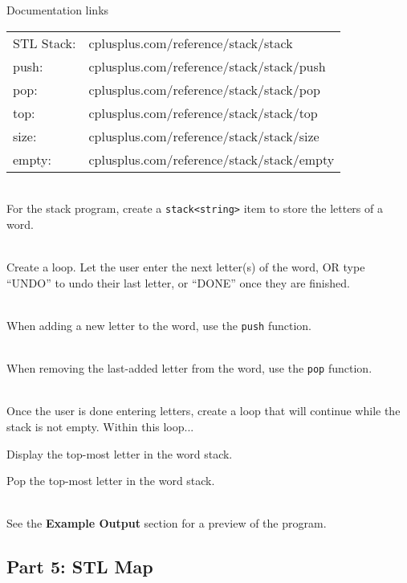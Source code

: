         
        \begin{hint}{Documentation links} ~\\
            \begin{tabular}{ l l }
                STL Stack:      & cplusplus.com/reference/stack/stack \\
                push:           & cplusplus.com/reference/stack/stack/push \\
                pop:            & cplusplus.com/reference/stack/stack/pop \\
                top:            & cplusplus.com/reference/stack/stack/top \\
                size:           & cplusplus.com/reference/stack/stack/size \\
                empty:          & cplusplus.com/reference/stack/stack/empty \\
            \end{tabular}
        \end{hint}

        ~\\ For the stack program, create a \texttt{stack<string>} item to store the letters of a word.

        ~\\ Create a loop. Let the user enter the next letter(s) of the word, OR type ``UNDO'' to undo their last letter,
        or ``DONE'' once they are finished.

        ~\\ When adding a new letter to the word, use the \texttt{push} function.

        ~\\ When removing the last-added letter from the word, use the \texttt{pop} function.

        ~\\ Once the user is done entering letters, create a loop that will continue while the stack is not empty. Within this loop...

        Display the top-most letter in the word stack.

        Pop the top-most letter in the word stack.

        ~\\ See the \textbf{Example Output} section for a preview of the program.

        \newpage
        \subsection{Part 5: STL Map}

